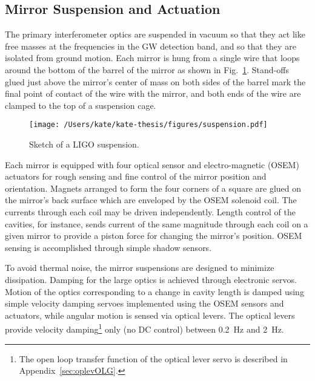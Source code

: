 



\subsection{Mirror Suspension and Actuation}
\label{sec:suspension}
The primary interferometer optics are suspended in vacuum so that they
act like free masses at the frequencies in the GW detection band, and
so that they are isolated from ground motion. Each mirror is hung from
a single wire that loops around the bottom of the barrel of the mirror
as shown in Fig.~\ref{fig:suspension}. Stand-offs glued just above the
mirror's center of mass on both sides of the barrel mark the final
point of contact of the wire with the mirror, and both ends of the
wire are clamped to the top of a suspension cage.

\begin{figure}
\begin{centering}
\texttt{[image: /Users/kate/kate-thesis/figures/suspension.pdf]}
\caption[Sketch of a LIGO suspension]{Sketch of a LIGO suspension.}
\label{fig:suspension}
\end{centering}
\end{figure}

Each mirror is equipped with four optical sensor and electro-magnetic
(OSEM) actuators for rough sensing and fine control of the mirror position and orientation. Magnets arranged
to form the four corners of a square are glued on the mirror's back
surface which are enveloped by the OSEM solenoid coil. 
The currents through each coil may be driven independently.
Length control of the
cavities, for instance, sends current of the same magnitude through
each coil on a given mirror to provide a piston force for changing the
mirror's position.  OSEM sensing is accomplished through simple shadow
sensors.

To avoid thermal noise, the mirror suspensions are designed to minimize 
dissipation.
Damping for the large optics is achieved through
electronic servos.  Motion of the optics corresponding to a change
in cavity length is damped using simple velocity damping servoes
implemented using the OSEM sensors and actuators, while angular
motion is sensed via optical levers.
The optical levers provide velocity damping\footnote{
The open loop transfer function of the optical lever
servo is described in Appendix~\ref{sec:oplevOLG}.
} only (no DC control) between
0.2~Hz and 2~Hz. 

